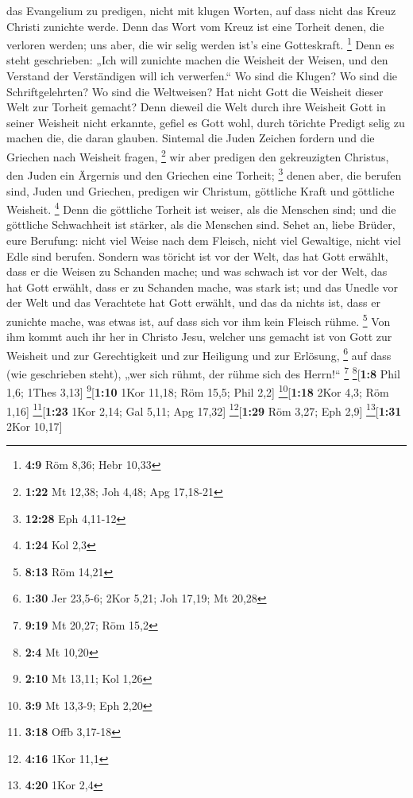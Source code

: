 das Evangelium zu predigen, nicht mit klugen Worten, auf dass nicht das
Kreuz Christi zunichte werde.  Denn das Wort vom Kreuz
ist eine Torheit denen, die verloren werden; uns aber, die wir selig
werden ist's eine Gotteskraft. \footnote{\textbf{4:9} Röm 8,36; Hebr
  10,33}  Denn es steht geschrieben: „Ich will zunichte
machen die Weisheit der Weisen, und den Verstand der Verständigen will
ich verwerfen.``  Wo sind die Klugen? Wo sind die
Schriftgelehrten? Wo sind die Weltweisen? Hat nicht Gott die Weisheit
dieser Welt zur Torheit gemacht?  Denn dieweil die Welt
durch ihre Weisheit Gott in seiner Weisheit nicht erkannte, gefiel es
Gott wohl, durch törichte Predigt selig zu machen die, die daran
glauben.  Sintemal die Juden Zeichen fordern und die
Griechen nach Weisheit fragen, \footnote{\textbf{1:22} Mt 12,38; Joh
  4,48; Apg 17,18-21}  wir aber predigen den gekreuzigten
Christus, den Juden ein Ärgernis und den Griechen eine Torheit;
\footnote{\textbf{12:28} Eph 4,11-12}  denen aber, die
berufen sind, Juden und Griechen, predigen wir Christum, göttliche Kraft
und göttliche Weisheit. \footnote{\textbf{1:24} Kol 2,3} 
Denn die göttliche Torheit ist weiser, als die Menschen sind; und die
göttliche Schwachheit ist stärker, als die Menschen sind.
 Sehet an, liebe Brüder, eure Berufung: nicht viel Weise
nach dem Fleisch, nicht viel Gewaltige, nicht viel Edle sind berufen.
 Sondern was töricht ist vor der Welt, das hat Gott
erwählt, dass er die Weisen zu Schanden mache; und was schwach ist vor
der Welt, das hat Gott erwählt, dass er zu Schanden mache, was stark
ist;  und das Unedle vor der Welt und das Verachtete hat
Gott erwählt, und das da nichts ist, dass er zunichte mache, was etwas
ist,  auf dass sich vor ihm kein Fleisch rühme.
\footnote{\textbf{8:13} Röm 14,21}  Von ihm kommt auch
ihr her in Christo Jesu, welcher uns gemacht ist von Gott zur Weisheit
und zur Gerechtigkeit und zur Heiligung und zur Erlösung, \footnote{\textbf{1:30}
  Jer 23,5-6; 2Kor 5,21; Joh 17,19; Mt 20,28}  auf dass
(wie geschrieben steht), „wer sich rühmt, der rühme sich des Herrn!{}``
\footnote{\textbf{9:19} Mt 20,27; Röm 15,2} \footnote{\textbf{2:4} Mt
  10,20}{[}\textbf{1:8} Phil 1,6; 1Thes 3,13{]}
\footnote{\textbf{2:10} Mt 13,11; Kol 1,26}{[}\textbf{1:10} 1Kor 11,18;
Röm 15,5; Phil 2,2{]} \footnote{\textbf{3:9} Mt 13,3-9; Eph 2,20}{[}\textbf{1:18}
2Kor 4,3; Röm 1,16{]} \footnote{\textbf{3:18} Offb 3,17-18}{[}\textbf{1:23}
1Kor 2,14; Gal 5,11; Apg 17,32{]} \footnote{\textbf{4:16} 1Kor 11,1}{[}\textbf{1:29}
Röm 3,27; Eph 2,9{]} \footnote{\textbf{4:20} 1Kor 2,4}{[}\textbf{1:31}
2Kor 10,17{]}

